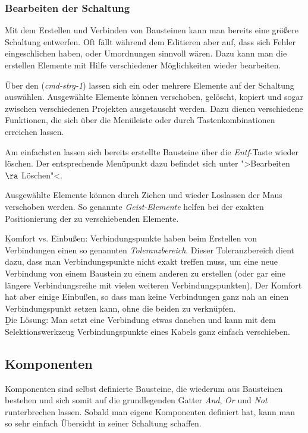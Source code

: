 \documentclass[12pt,a4paper]{scrartcl}
\begin{document}
\subsubsection{Bearbeiten der Schaltung}
Mit dem Erstellen und Verbinden von Bausteinen kann man bereits eine größere Schaltung entwerfen. Oft fällt während dem Editieren aber auf, dass sich Fehler eingeschlichen haben, oder Umordnungen sinnvoll wären. Dazu kann man die erstellen Elemente mit Hilfe verschiedener Möglichkeiten wieder bearbeiten.

Über den (\textit{\gls{cmd-strg-1}}) lassen sich ein oder mehrere Elemente auf der Schaltung auswählen. Ausgewählte Elemente können verschoben, gelöscht, kopiert und sogar zwischen verschiedenen Projekten ausgetauscht werden. Dazu dienen verschiedene Funktionen, die sich über die Menüleiste oder durch Tastenkombinationen erreichen lassen.

Am einfachsten lassen sich bereits erstellte Bausteine über die \textit{Entf}-Taste wieder löschen. Der entsprechende Menüpunkt dazu befindet sich unter ">Bearbeiten $\ra$ Löschen"<.

Ausgewählte Elemente können durch Ziehen und wieder Loslassen der Maus verschoben werden. So genannte \textit{Geist-Elemente} helfen bei der exakten Positionierung der zu verschiebenden Elemente.
\begin{info}
	\b{Komfort vs. Einbußen:} Verbindungspunkte haben beim Erstellen von Verbindungen einen so genannten \textit{Toleranzbereich}. Dieser Toleranzbereich dient dazu, dass man Verbindungspunkte nicht exakt treffen muss, um eine neue Verbindung von einem Baustein zu einem anderen zu erstellen (oder gar eine längere Verbindungsreihe mit vielen weiteren Verbindungspunkten).
	Der Komfort hat aber einige Einbußen, so dass man keine Verbindungen ganz nah an einen Verbindungspunkt setzen kann, ohne die beiden zu verknüpfen. \\
	\b{Die Lösung:} Man setzt eine Verbindung etwas daneben und kann mit dem Selektionswerkzeug Verbindungspunkte eines Kabels ganz einfach verschieben.
\end{info}

\subsection{Komponenten}
Komponenten sind selbst definierte Bausteine, die wiederum aus Bausteinen bestehen und sich somit auf die grundlegenden Gatter \textit{And}, \textit{Or} und \textit{Not} runterbrechen lassen. Sobald man eigene Komponenten definiert hat, kann man so sehr einfach Übersicht in seiner Schaltung schaffen.
\end{document}
